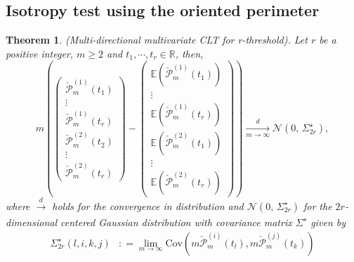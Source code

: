 \documentclass[12pt]{article}
\theoremstyle{Theorem}
\newtheorem{Theorem}{Theorem}[section]
\begin{document}
\subsection{Isotropy test using the oriented perimeter}
\begin{Theorem}(Multi-directional multivariate CLT for r-threshold). Let $r$ be a positive integer, $m \geq 2$ and $t_{1}, \cdots,t_{r} \in \mathbb{R}$, then, 
\begin{equation*}
m\left(\begin{pmatrix} \check{\mathcal{P}}^{\scriptscriptstyle (1)}_{m}(t_{1}) \\  \vdots \\ \check{\mathcal{P}}^{\scriptscriptstyle (1)}_{m}(t_{r}) \\ \check{\mathcal{P}}^{\scriptscriptstyle (2)}_{m}(t_{2}) \\  \vdots \\ \check{\mathcal{P}}^{\scriptscriptstyle (2)}_{m}(t_{r})  \end{pmatrix} - \begin{pmatrix} \mathbb{E}(\check{\mathcal{P}}^{\scriptscriptstyle (1)}_{m}(t_{1}))  \\ \vdots \\ \mathbb{E}(\check{\mathcal{P}}^{\scriptscriptstyle (1)}_{m}(t_{r}))\\\mathbb{E}(\check{\mathcal{P}}^{\scriptscriptstyle (2)}_{m}(t_{1})) \\ \vdots \\ \mathbb{E}(\check{\mathcal{P}}^{\scriptscriptstyle (2)}_{m}(t_{r})) \end{pmatrix}\right) \xrightarrow[m \to \infty]{d} \mathcal{N}\left(0,\,\Sigma_{2r}^{\star}\right),
\end{equation*}
where $\xrightarrow[]{d}$ holds for the convergence in distribution and $\mathcal{N}\left(0,\,\Sigma_{2r}^{\star}\right)$ for the $2r$-dimensional centered Gaussian distribution with covariance matrix $\Sigma^\star$ given by
\begin{align*}
\Sigma^{\star}_{2r}(l,i,k,j) & : = \lim_{m \to \infty}\text{Cov}\left(m\check{\mathcal{P}}^{\scriptscriptstyle (i)}_{m}(t_{l}), m\check{\mathcal{P}}^{\scriptscriptstyle (j)}_{m}(t_{k}) \right)
\end{align*}
\end{Theorem}
\end{document}
